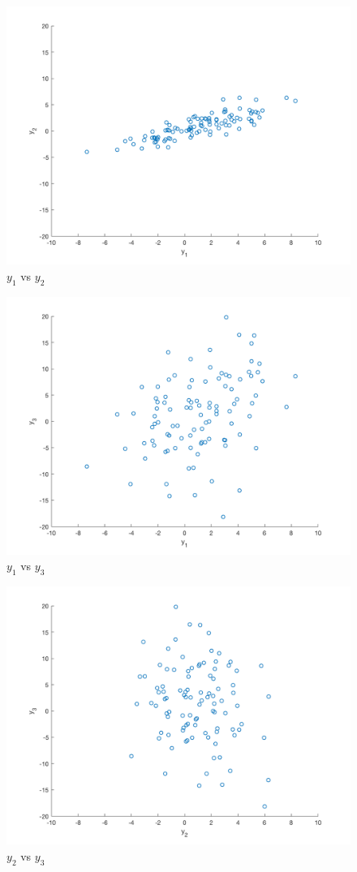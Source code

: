 \documentclass[11pt]{article}
\begin{document}
\subparagraph*{}
\begin{figure}[h!]
	\centering
	\includegraphics[width=0.8\linewidth]{p2_plot1.png}
	\caption{$y_1$ vs $y_2$}
	\label{p2_plot1}
\end{figure}
\begin{figure}[h!]
	\centering
	\includegraphics[width=0.8\linewidth]{p2_plot2.png}
	\caption{$y_1$ vs $y_3$}
	\label{p2_plot2}
\end{figure}
\begin{figure}[h!]
	\centering
	\includegraphics[width=0.8\linewidth]{p2_plot3.png}
	\caption{$y_2$ vs $y_3$}
	\label{p2_plot3}
\end{figure}
\end{document}

